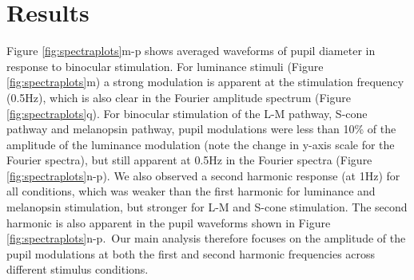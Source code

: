 \documentclass[
]{article}
\begin{document}
\hypertarget{results}{%
\section{Results}\label{results}}

Figure \ref{fig:spectraplots}m-p shows averaged waveforms of pupil diameter in response to binocular stimulation. For luminance stimuli (Figure \ref{fig:spectraplots}m) a strong modulation is apparent at the stimulation frequency (0.5Hz), which is also clear in the Fourier amplitude spectrum (Figure \ref{fig:spectraplots}q). For binocular stimulation of the L-M pathway, S-cone pathway and melanopsin pathway, pupil modulations were less than 10\% of the amplitude of the luminance modulation (note the change in y-axis scale for the Fourier spectra), but still apparent at 0.5Hz in the Fourier spectra (Figure \ref{fig:spectraplots}n-p). We also observed a second harmonic response (at 1Hz) for all conditions, which was weaker than the first harmonic for luminance and melanopsin stimulation, but stronger for L-M and S-cone stimulation. The second harmonic is also apparent in the pupil waveforms shown in Figure \ref{fig:spectraplots}n-p.~Our main analysis therefore focuses on the amplitude of the pupil modulations at both the first and second harmonic frequencies across different stimulus conditions.
\end{document}
